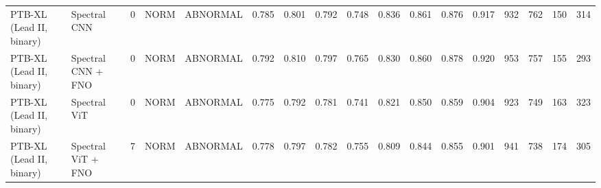 \begin{longtable}{lllllllllllllllll}
PTB-XL (Lead II, binary) & Spectral CNN & 0 & NORM & ABNORMAL & 0.785 & 0.801 & 0.792 & 0.748 & 0.836 & 0.861 & 0.876 & 0.917 & 932 & 762 & 150 & 314 \\
PTB-XL (Lead II, binary) & Spectral CNN + FNO & 0 & NORM & ABNORMAL & 0.792 & 0.810 & 0.797 & 0.765 & 0.830 & 0.860 & 0.878 & 0.920 & 953 & 757 & 155 & 293 \\
PTB-XL (Lead II, binary) & Spectral ViT & 0 & NORM & ABNORMAL & 0.775 & 0.792 & 0.781 & 0.741 & 0.821 & 0.850 & 0.859 & 0.904 & 923 & 749 & 163 & 323 \\
PTB-XL (Lead II, binary) & Spectral ViT + FNO & 7 & NORM & ABNORMAL & 0.778 & 0.797 & 0.782 & 0.755 & 0.809 & 0.844 & 0.855 & 0.901 & 941 & 738 & 174 & 305 \\
\end{longtable}
